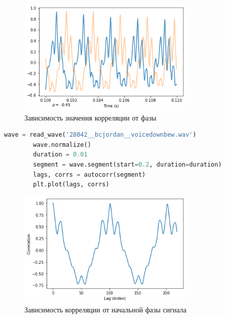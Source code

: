 \documentclass[a4paper, 12pt]{report}
\begin{document}
	\begin{figure}[H]
		\centering
		\includegraphics[width=0.75\textwidth]{acr5.png}
		\caption{Зависимость значения корреляции от фазы}
		\label{fig:arc5}
	\end{figure}
	\begin{lstlisting}[language=Python,caption=Автокорреляция чирпа]
		wave = read_wave('28042__bcjordan__voicedownbew.wav')
		wave.normalize()
		duration = 0.01
		segment = wave.segment(start=0.2, duration=duration)
		lags, corrs = autocorr(segment)
		plt.plot(lags, corrs)
	\end{lstlisting}
	\begin{figure}[H]
		\centering
		\includegraphics[width=0.75\textwidth]{acr6.png}
		\caption{Зависимость корреляции от начальной фазы сигнала}
		\label{fig:arc6}
	\end{figure}
\end{document}
